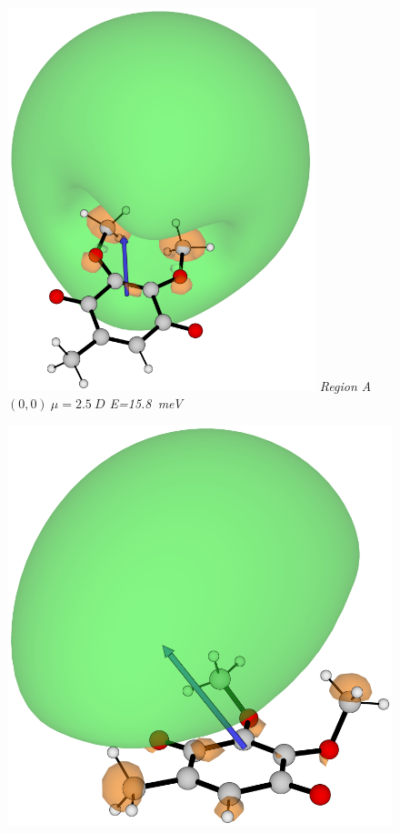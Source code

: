 \begin{figure}[b!]
\begin{minipage}[b]{0.30\textwidth}
      \includegraphics[width=0.8\textwidth]{chapters/results/image/Q0_181.png}
      \small\emph{Region A \\ $(0,0)~\mu=2.5~D$ E=15.8~meV}
  \end{minipage}
  \hfill
  \begin{minipage}[b]{0.30\textwidth}
    \centering
      \includegraphics[width=\textwidth]{chapters/results/image/Q0_52.png}

\end{minipage}
\end{figure}
